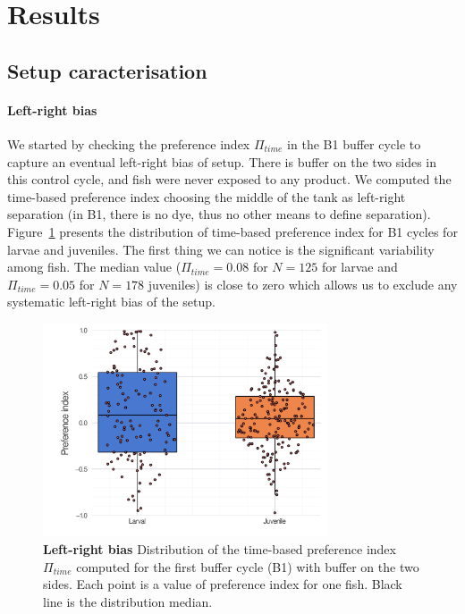   \section{Results}
  \subsection{Setup caracterisation}
  \paragraph{Left-right bias} We started by checking the preference index $\Pi_{time}$ in the B1 buffer cycle to capture an eventual left-right bias of setup. There is buffer on the two sides in this control cycle, and fish were never exposed to any product. We computed the time-based preference index choosing the middle of the tank as left-right separation (in B1, there is no dye, thus no other means to define separation). Figure~\ref{ld_bias} presents the distribution of time-based preference index for B1 cycles for larvae and juveniles. The first thing we can notice is the significant variability among fish. The median value ($\Pi_{time} = 0.08$ for $N=125$ for larvae and $\Pi_{time} = 0.05$ for $N = 178$ juveniles) is close to zero which allows us to exclude any systematic left-right bias of the setup.

    \begin{figure}[htb]
      \centering
      \includegraphics[width=0.75\textwidth]{part_2/assets/ld_bias.png}
      \caption{\textbf{Left-right bias} Distribution of the time-based preference index $\Pi_{time}$ computed for the first buffer cycle (B1) with buffer on the two sides. Each point is a value of preference index for one fish. Black line is the distribution median.}
      \label{ld_bias}
    \end{figure}


